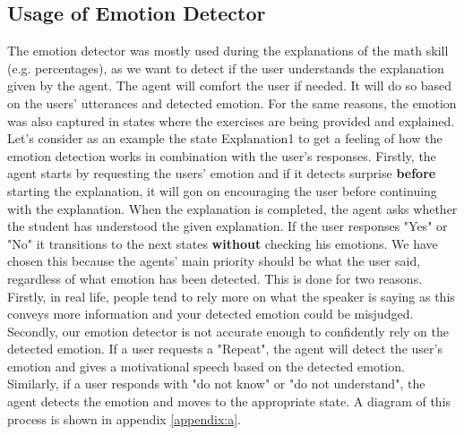 \subsection{Usage of Emotion Detector}
The emotion detector was mostly used during the explanations of the math skill (e.g. percentages), as we want to detect if the user understands the explanation given by the agent. The agent will comfort the user if needed. It will do so based on the users' utterances and detected emotion. 
For the same reasons, the emotion was also captured in states where the exercises are being provided and explained.
\newline
\newline
Let's consider as an example the state Explanation1 to get a feeling of how the emotion detection works in combination with the user's responses. Firstly, the agent starts by requesting the users' emotion and if it detects surprise \textbf{before} starting the explanation, it will gon on encouraging the user before continuing with the explanation. When the explanation is completed, the agent asks whether the student has understood the given explanation. If the user responses "Yes" or "No" it transitions to the next states \textbf{without} checking his emotions. We have chosen this because the agents' main priority should be what the user said, regardless of what emotion has been detected. This is done for two reasons. Firstly, in real life, people tend to rely more on what the speaker is saying as this conveys more information and your detected emotion could be misjudged. Secondly, our emotion detector is not accurate enough to confidently rely on the detected emotion. 
If a user requests a "Repeat", the agent will detect the user's emotion and gives a motivational speech based on the detected emotion. Similarly, if a user responds with "do not know" or "do not understand", the agent detects the emotion and moves to the appropriate state. A diagram of this process is shown in appendix \ref{appendix:a}.